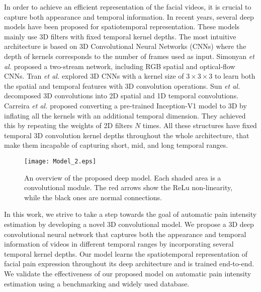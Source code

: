 \documentclass[a4paper,conference]{IEEEtran}
\begin{document}
In order to achieve an efficient representation of the facial videos, it is crucial to capture both appearance and temporal information. In recent years, several deep models have been proposed for spatiotemporal representation. These models mainly use 3D filters with fixed temporal kernel depths. The most intuitive architecture is based on 3D Convolutional Neural Networks (CNNs) \cite{c13} where the depth of kernels corresponds to the number of frames used as input. Simonyan \emph{et al.} \cite{c14} proposed a two-stream network, including RGB spatial and optical-flow CNNs. Tran \emph{et al.} \cite{c15} explored 3D CNNs with a kernel size of $3\times 3\times 3$ to learn both the spatial and temporal features with 3D convolution operations. Sun \emph{et al.} \cite{c16} decomposed 3D convolutions into 2D spatial and 1D temporal convolutions. Carreira \emph{et al.} \cite{c17} proposed converting a pre-trained Inception-V1 \cite{c18} model to 3D by inflating all the kernels with an additional temporal dimension. They achieved this by repeating the weights of 2D filters $N$ times. All these structures have fixed temporal 3D convolution kernel depths throughout the whole architecture, that make them incapable of capturing short, mid, and long temporal ranges. 
\begin{figure*}[t]
\begin{center}
	\texttt{[image: Model\_2.eps]}
\end{center}
	\caption{An overview of the proposed deep model. Each shaded area is a convolutional module. The red arrows show the ReLu non-linearity, while the black ones are normal connections.}
    \label{Fig1}
\end{figure*}

In this work, we strive to take a step towards the goal of automatic pain intensity estimation by developing a novel 3D convolutional model. We propose a 3D deep convolutional neural network that captures both the appearance and temporal information of videos in different temporal ranges by incorporating several temporal kernel depths. Our model learns the spatiotemporal representation of facial pain expression throughout its deep architecture and is trained end-to-end. We validate the effectiveness of our proposed model on automatic pain intensity estimation using a benchmarking and widely used database. %
\end{document}
